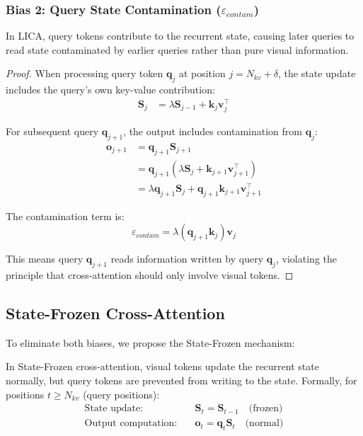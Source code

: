 \subsubsection{Bias 2: Query State Contamination ($\varepsilon_{contam}$)}

\begin{theorem}
In LICA, query tokens contribute to the recurrent state, causing later queries to read state contaminated by earlier queries rather than pure visual information.
\end{theorem}

\begin{proof}
When processing query token $\mathbf{q}_j$ at position $j = N_{kv} + \delta$, the state update includes the query's own key-value contribution:
\begin{align}
\mathbf{S}_j &= \lambda \mathbf{S}_{j-1} + \mathbf{k}_j \mathbf{v}_j^\top
\end{align}

For subsequent query $\mathbf{q}_{j+1}$, the output includes contamination from $\mathbf{q}_j$:
\begin{align}
\mathbf{o}_{j+1} &= \mathbf{q}_{j+1} \mathbf{S}_{j+1} \\
&= \mathbf{q}_{j+1} (\lambda \mathbf{S}_j + \mathbf{k}_{j+1} \mathbf{v}_{j+1}^\top) \\
&= \lambda \mathbf{q}_{j+1} \mathbf{S}_j + \mathbf{q}_{j+1} \mathbf{k}_{j+1} \mathbf{v}_{j+1}^\top
\end{align}

The contamination term is:
\begin{equation}
\varepsilon_{contam} = \lambda (\mathbf{q}_{j+1} \mathbf{k}_j) \mathbf{v}_j
\end{equation}

This means query $\mathbf{q}_{j+1}$ reads information written by query $\mathbf{q}_j$, violating the principle that cross-attention should only involve visual tokens.
\end{proof}

\subsection{State-Frozen Cross-Attention}

To eliminate both biases, we propose the State-Frozen mechanism:

\begin{definition}
In State-Frozen cross-attention, visual tokens update the recurrent state normally, but query tokens are prevented from writing to the state. Formally, for positions $t \geq N_{kv}$ (query positions):
\begin{align}
\text{State update:} \quad &\mathbf{S}_t = \mathbf{S}_{t-1} \quad \text{(frozen)} \\
\text{Output computation:} \quad &\mathbf{o}_t = \mathbf{q}_t \mathbf{S}_t \quad \text{(normal)}
\end{align}
\end{definition}


